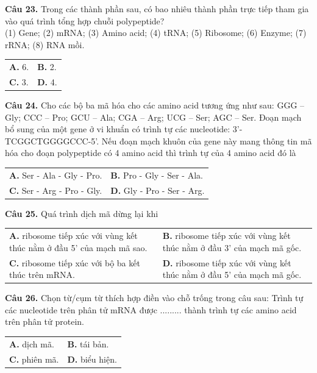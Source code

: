 \documentclass{article}
\begin{document}
\begin{minipage}[t][14.4cm][t]{\linewidth}
\fontsize{20}{26}\selectfont

\textbf{Câu 23.} Trong các thành phần sau, có bao nhiêu thành phần trực tiếp tham gia vào quá trình tổng hợp chuỗi polypeptide?\\[3pt](1) Gene; (2) mRNA; (3) Amino acid; (4) tRNA; (5) Ribosome; (6) Enzyme; (7) rRNA; (8) RNA mồi.\\[4pt]
\begin{tabularx}{\linewidth}{@{}X X@{}}
\textbf{A. } 6. & \textbf{B. } 2.\\[4pt]
\textbf{C. } 3. & \textbf{D. } 4.
\end{tabularx}
\vspace*{\fill}
\textbf{Câu 24.} Cho các bộ ba mã hóa cho các amino acid tương ứng như sau: GGG – Gly; CCC – Pro; GCU – Ala; CGA – Arg; UCG – Ser; AGC – Ser. Đoạn mạch bổ sung của một gene ở vi khuẩn có trình tự các nucleotide: 3'-TCGGCTGGGGCCC-5'. Nếu đoạn mạch khuôn của gene này mang thông tin mã hóa cho đoạn polypeptide có 4 amino acid thì trình tự của 4 amino acid đó là\\[4pt]
\begin{tabularx}{\linewidth}{@{}X X@{}}
\textbf{A. } Ser - Ala - Gly - Pro. & \textbf{B. } Pro - Gly - Ser - Ala.\\[4pt]
\textbf{C. } Ser - Arg - Pro - Gly. & \textbf{D. } Gly - Pro - Ser - Arg.
\end{tabularx}

\end{minipage}
\newpage


\begin{minipage}[t][14.4cm][t]{\linewidth}
\fontsize{20}{26}\selectfont

\textbf{Câu 25.} Quá trình dịch mã dừng lại khi\\[4pt]
\begin{tabularx}{\linewidth}{@{}X X@{}}
\textbf{A. } ribosome tiếp xúc với vùng kết thúc nằm ở đầu 5' của mạch mã sao. & \textbf{B. } ribosome tiếp xúc với vùng kết thúc nằm ở đầu 3' của mạch mã gốc.\\[4pt]
\textbf{C. } ribosome tiếp xúc với bộ ba kết thúc trên mRNA. & \textbf{D. } ribosome tiếp xúc với vùng kết thúc nằm ở đầu 5' của mạch mã gốc.
\end{tabularx}
\vspace*{\fill}
\textbf{Câu 26.} Chọn từ/cụm từ thích hợp điền vào chỗ trống trong câu sau: Trình tự các nucleotide trên phân tử mRNA được ......... thành trình tự các amino acid trên phân tử protein.\\[4pt]
\begin{tabularx}{\linewidth}{@{}X X@{}}
\textbf{A. } dịch mã. & \textbf{B. } tái bản.\\[4pt]
\textbf{C. } phiên mã. & \textbf{D. } biểu hiện.
\end{tabularx}

\end{minipage}
\newpage
\end{document}

